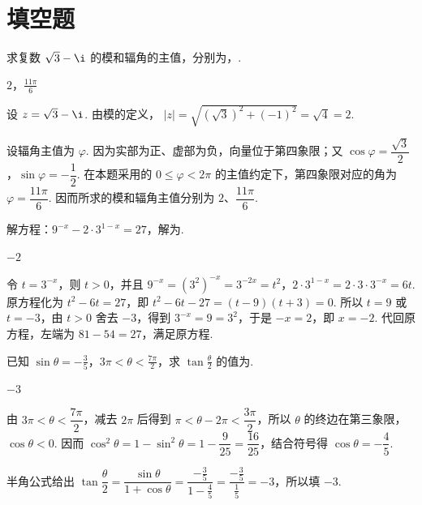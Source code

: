 \section{填空题}

\begin{problem}
求复数 \(\sqrt{3} - \i\) 的模和辐角的主值，分别为\fillinblank{}，\fillinblank{}.
\end{problem}

\begin{answer}
\(2\)，\(\frac{11\pi}{6}\)
\end{answer}

\begin{solution}
设 \(z=\sqrt3-\i\). 由模的定义，
\(\lvert z\rvert=\sqrt{\left(\sqrt3\right)^2+(-1)^2}=\sqrt4=2\).

设辐角主值为 \(\varphi\). 因为实部为正、虚部为负，向量位于第四象限；又
\(\cos\varphi=\dfrac{\sqrt3}{2}\)，\(\sin\varphi=-\dfrac12\). 在本题采用的 \(0\leq\varphi<2\pi\) 的主值约定下，第四象限对应的角为 \(\varphi=\dfrac{11\pi}{6}\). 因而所求的模和辐角主值分别为 \(2\)、\(\dfrac{11\pi}{6}\).
\end{solution}

\begin{problem}
解方程：\(9^{-x} - 2 \cdot 3^{1-x} = 27\)，解为\fillinblank{}.
\end{problem}

\begin{answer}
\(-2\)
\end{answer}

\begin{solution}
令 \(t=3^{-x}\)，则 \(t>0\)，并且
\(9^{-x}=\left(3^2\right)^{-x}=3^{-2x}=t^2\)，\(2\cdot3^{1-x}=2\cdot3\cdot3^{-x}=6t\). 原方程化为
\(t^2-6t=27\)，即
\(t^2-6t-27=(t-9)(t+3)=0\). 所以 \(t=9\) 或 \(t=-3\)，由 \(t>0\) 舍去 \(-3\)，得到 \(3^{-x}=9=3^2\)，于是 \(-x=2\)，即 \(x=-2\). 代回原方程，左端为 \(81-54=27\)，满足原方程.
\end{solution}

\begin{problem}
已知 \(\sin\theta = -\frac{3}{5}\)，\(3\pi < \theta < \frac{7\pi}{2}\)，求 \(\tan\frac{\theta}{2}\) 的值为\fillinblank{}.
\end{problem}

\begin{answer}
\(-3\)
\end{answer}

\begin{solution}
由 \(3\pi<\theta<\dfrac{7\pi}{2}\)，减去 \(2\pi\) 后得到
\(\pi<\theta-2\pi<\dfrac{3\pi}{2}\)，所以 \(\theta\) 的终边在第三象限，\(\cos\theta<0\). 因而
\(\cos^2\theta=1-\sin^2\theta=1-\dfrac9{25}=\dfrac{16}{25}\)，结合符号得 \(\cos\theta=-\dfrac45\).

半角公式给出
\(\tan\dfrac\theta2=\dfrac{\sin\theta}{1+\cos\theta}=\dfrac{-\frac35}{1-\frac45}=\dfrac{-\frac35}{\frac15}=-3\)，所以填 \(-3\).
\end{solution}

